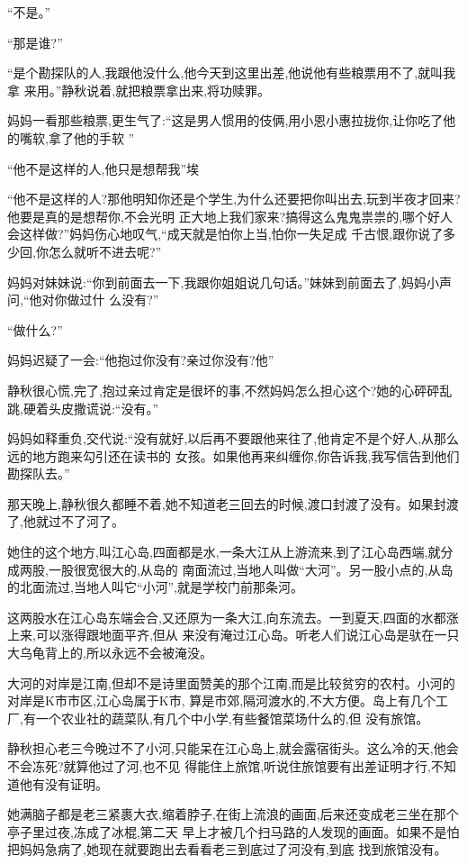 ﻿\documentclass[12pt]{article}
\begin{document}
``不是。''

``那是谁?''

``是个\myrule 勘探队的人,我跟他没什么,他\myrule 今天到这里出差,他\myrule 说他有些粮票用不了,就叫我拿
来用。''静秋说着,就把粮票拿出来,将功赎罪。

妈妈一看那些粮票,更生气了:``这是男人惯用的伎俩,用小恩小惠拉拢你,让你吃了他的嘴软,拿了他的手软\myrule 
''

``他不是这样的人,他只是想\myrule 帮我\myrule ''埃

``他不是这样的人?那他明知你还是个学生,为什么还要把你叫出去,玩到半夜才回来?他要是真的是想帮你,不会光明
正大地上我们家来?搞得这么鬼鬼祟祟的,哪个好人会这样做?''妈妈伤心地叹气,``成天就是怕你上当,怕你一失足成
千古恨,跟你说了多少回,你怎么就听不进去呢?''

妈妈对妹妹说:``你到前面去一下,我跟你姐姐说几句话。''妹妹到前面去了,妈妈小声问,``他\myrule 对你做过什
么没有?''

``做什么?''

妈妈迟疑了一会:``他\myrule 抱过你没有?亲过你没有?他\myrule ''

静秋很心慌,完了,抱过亲过肯定是很坏的事,不然妈妈怎么担心这个?她的心砰砰乱跳,硬着头皮撒谎说:``没有。''

妈妈如释重负,交代说:``没有就好,以后再不要跟他来往了,他肯定不是个好人,从那么远的地方跑来勾引还在读书的
女孩。如果他再来纠缠你,你告诉我,我写信告到他们勘探队去。''

那天晚上,静秋很久都睡不着,她不知道老三回去的时候,渡口封渡了没有。如果封渡了,他就过不了河了。

她住的这个地方,叫江心岛,四面都是水,一条大江从上游流来,到了江心岛西端,就分成两股,一股很宽很大的,从岛的
南面流过,当地人叫做``大河''。另一股小点的,从岛的北面流过,当地人叫它``小河'',就是学校门前那条河。

这两股水在江心岛东端会合,又还原为一条大江,向东流去。一到夏天,四面的水都涨上来,可以涨得跟地面平齐,但从
来没有淹过江心岛。听老人们说江心岛是驮在一只大乌龟背上的,所以永远不会被淹没。

大河的对岸是江南,但却不是诗里面赞美的那个江南,而是比较贫穷的农村。小河的对岸是K市市区,江心岛属于K市,
算是市郊,隔河渡水的,不大方便。岛上有几个工厂,有一个农业社的蔬菜队,有几个中小学,有些餐馆菜场什么的,但
没有旅馆。

静秋担心老三今晚过不了小河,只能呆在江心岛上,就会露宿街头。这么冷的天,他会不会冻死?就算他过了河,也不见
得能住上旅馆,听说住旅馆要有出差证明才行,不知道他有没有证明。

她满脑子都是老三紧裹大衣,缩着脖子,在街上流浪的画面,后来还变成老三坐在那个亭子里过夜,冻成了冰棍,第二天
早上才被几个扫马路的人发现的画面。如果不是怕把妈妈急病了,她现在就要跑出去看看老三到底过了河没有,到底
找到旅馆没有。
\end{document}
